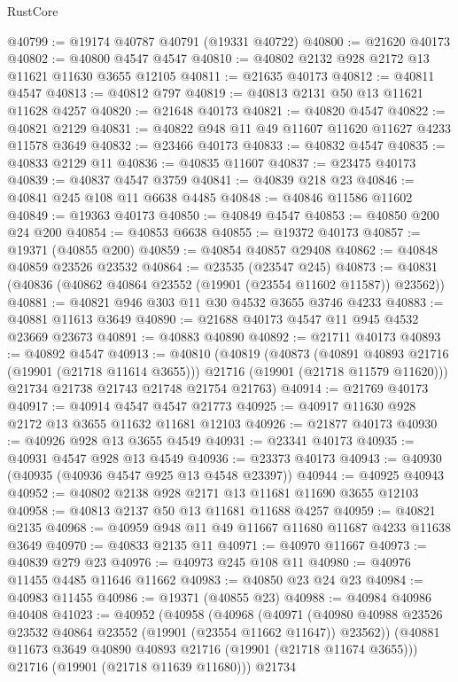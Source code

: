 \begin{lexlean}{RustCore}
\begin{coremodule}
@40799 := @19174 @40787 @40791 (@19331 @40722)
@40800 := @21620 @40173
@40802 := @40800 @4547 @4547
@40810 := @40802 @2132 @928 @2172 @13 @11621 @11630 @3655 @12105
@40811 := @21635 @40173
@40812 := @40811 @4547
@40813 := @40812 @797
@40819 := @40813 @2131 @50 @13 @11621 @11628 @4257
@40820 := @21648 @40173
@40821 := @40820 @4547
@40822 := @40821 @2129
@40831 := @40822 @948 @11 @49 @11607 @11620 @11627 @4233 @11578 @3649
@40832 := @23466 @40173
@40833 := @40832 @4547
@40835 := @40833 @2129 @11
@40836 := @40835 @11607
@40837 := @23475 @40173
@40839 := @40837 @4547 @3759
@40841 := @40839 @218 @23
@40846 := @40841 @245 @108 @11 @6638 @4485
@40848 := @40846 @11586 @11602
@40849 := @19363 @40173
@40850 := @40849 @4547
@40853 := @40850 @200 @24 @200
@40854 := @40853 @6638
@40855 := @19372 @40173
@40857 := @19371 (@40855 @200)
@40859 := @40854 @40857 @29408
@40862 := @40848 @40859 @23526 @23532
@40864 := @23535 (@23547 @245)
@40873 := @40831 (@40836 (@40862 @40864 @23552 (@19901 (@23554 @11602 @11587)) @23562))
@40881 := @40821 @946 @303 @11 @30 @4532 @3655 @3746 @4233
@40883 := @40881 @11613 @3649
@40890 := @21688 @40173 @4547 @11 @945 @4532 @23669 @23673
@40891 := @40883 @40890
@40892 := @21711 @40173
@40893 := @40892 @4547
@40913 := @40810
    (@40819
      (@40873
        (@40891 @40893 @21716 (@19901 (@21718 @11614 @3655)))
        @21716
        (@19901 (@21718 @11579 @11620)))
      @21734
      @21738
      @21743
      @21748
      @21754
      @21763)
@40914 := @21769 @40173
@40917 := @40914 @4547 @4547 @21773
@40925 := @40917 @11630 @928 @2172 @13 @3655 @11632 @11681 @12103
@40926 := @21877 @40173
@40930 := @40926 @928 @13 @3655 @4549
@40931 := @23341 @40173
@40935 := @40931 @4547 @928 @13 @4549
@40936 := @23373 @40173
@40943 := @40930 (@40935 (@40936 @4547 @925 @13 @4548 @23397))
@40944 := @40925 @40943
@40952 := @40802 @2138 @928 @2171 @13 @11681 @11690 @3655 @12103
@40958 := @40813 @2137 @50 @13 @11681 @11688 @4257
@40959 := @40821 @2135
@40968 := @40959 @948 @11 @49 @11667 @11680 @11687 @4233 @11638 @3649
@40970 := @40833 @2135 @11
@40971 := @40970 @11667
@40973 := @40839 @279 @23
@40976 := @40973 @245 @108 @11
@40980 := @40976 @11455 @4485 @11646 @11662
@40983 := @40850 @23 @24 @23
@40984 := @40983 @11455
@40986 := @19371 (@40855 @23)
@40988 := @40984 @40986 @40408
@41023 := @40952
    (@40958
      (@40968
        (@40971 (@40980 @40988 @23526 @23532 @40864 @23552 (@19901 (@23554 @11662 @11647)) @23562))
        (@40881 @11673 @3649 @40890 @40893 @21716 (@19901 (@21718 @11674 @3655)))
        @21716
        (@19901 (@21718 @11639 @11680)))
      @21734

\end{coremodule}
\end{lexlean}
